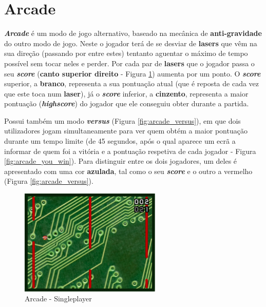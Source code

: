 \documentclass{report}
\begin{document}
\pagebreak

\section{Arcade}

\textbf{\textit{Arcade}} é um modo de jogo alternativo, baseado na mecânica de \textbf{anti-gravidade} do outro modo de jogo. Neste o jogador terá de se desviar de \textbf{lasers} que vêm na sua direção (passando por entre estes) tentanto aguentar o máximo de tempo possível sem tocar neles e perder. Por cada par de \textbf{lasers} que o jogador passa o seu \textbf{\textit{score}} (\textbf{canto superior direito} - Figura \ref{fig:arcade_singleplayer}) aumenta por um ponto. O \textbf{\textit{score}} superior, a \textbf{branco}, representa a sua pontuação atual (que é reposta de cada vez que este toca num \textbf{laser}), já o \textbf{\textit{score}} inferior, a \textbf{cinzento}, representa a maior pontuação (\textbf{\textit{highscore}}) do jogador que ele conseguiu obter durante a partida.

Possui também um modo \textbf{\textit{versus}} (Figura \ref{fig:arcade_versus}), em que dois utilizadores jogam simultaneamente para ver quem obtém a maior pontuação durante um tempo limite (de 45 segundos, após o qual aparece um ecrã a informar de quem foi a vitória e a pontuação respetiva de cada jogador - Figura \ref{fig:arcade_you_win}). Para distinguir entre os dois jogadores, um deles é apresentado com uma cor \textbf{azulada}, tal como o seu \textbf{\textit{score}} e o outro a vermelho (Figura \ref{fig:arcade_versus}).

\begin{figure}[H]
	\centering
	\includegraphics[width=0.6\textwidth]{arcade}
	\caption{Arcade - Singleplayer}
	\label{fig:arcade_singleplayer}
\end{figure}
\end{document}
